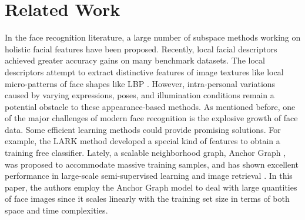 \documentclass[10pt,twocolumn,letterpaper]{article}
\begin{document}
\section{Related Work}
In the face recognition literature, a large number of subspace
methods \cite{belhumeur1996eigenfaces,moghaddam2000bayesian,wang2004dual,wang2004unified,li2005nonparametric} working
on holistic facial features have been proposed. Recently, local
facial descriptors \cite{ahonen2006face} achieved greater accuracy
gains on many benchmark datasets. The local descriptors
attempt to extract distinctive features of image textures like local micro-patterns of face shapes like LBP
\cite{ahonen2006face}. However, intra-personal variations caused by varying
expressions, poses, and illumination conditions remain a
potential obstacle to these appearance-based methods.
As mentioned before, one of the major challenges of
modern face recognition is the explosive growth of face data.
Some efficient learning methods could provide promising
solutions. For example, the LARK method \cite{lowe2004distinctive} developed
a special kind of features to obtain a training free classifier.
Lately, a scalable neighborhood graph, Anchor Graph
, was proposed to accommodate massive training samples,
and has shown excellent performance in large-scale
semi-supervised learning  and image retrieval . In
this paper, the authors employ the Anchor Graph model to deal with
large quantities of face images since it scales linearly with
the training set size in terms of both space and time complexities.

{\small


}
\end{document}
